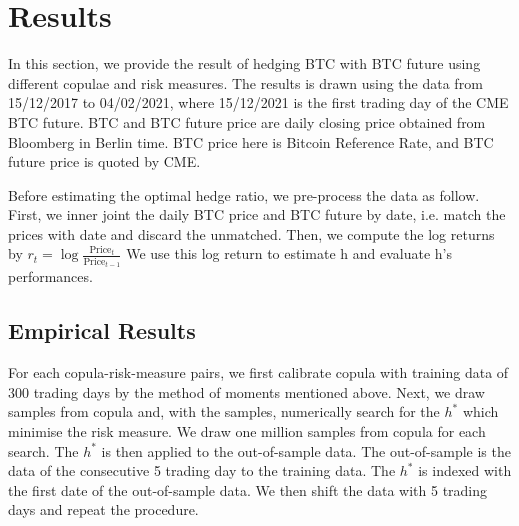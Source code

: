 \section{Results}
In this section, we provide the result of hedging BTC with BTC future using different copulae and risk measures.
The results is drawn using the data from 15/12/2017 to 04/02/2021, where 15/12/2021 is the first trading day of the CME BTC future.
BTC and BTC future price are daily closing price obtained from Bloomberg in Berlin time.
BTC price here is Bitcoin Reference Rate, and BTC future price is quoted by CME. \medskip

Before estimating the optimal hedge ratio, we pre-process the data as follow.
First, we inner joint the daily BTC price and BTC future by date,
i.e. match the prices with date and discard the unmatched.
Then, we compute the log returns by $r_t = \log \frac{\text{Price}_t}{\text{Price}_{t-1}}$
We use this log return to estimate h and evaluate h’s performances.

\subsection{Empirical Results}\label{subsec:empirical-results}
For each copula-risk-measure pairs,
we first calibrate copula with training data of 300 trading days by the method of moments mentioned above.
Next, we draw samples from copula and, with the samples, numerically search for the $h^*$ which minimise the risk measure.
We draw one million samples from copula for each search.
The $h^*$ is then applied to the out-of-sample data.
The out-of-sample is the data of the consecutive 5 trading day to the training data.
The $h^*$ is indexed with the first date of the out-of-sample data.
We then shift the data with 5 trading days and repeat the procedure. \medskip


